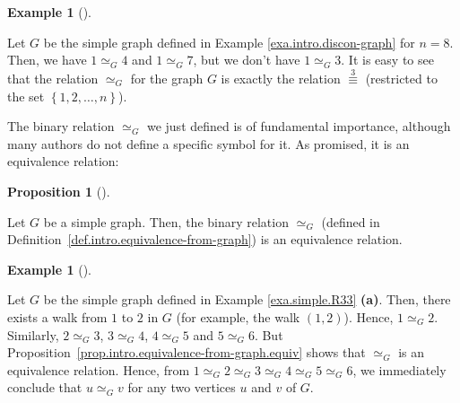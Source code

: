 \documentclass[numbers=enddot,12pt,final,onecolumn,notitlepage]{scrartcl}%
\theoremstyle{definition}
\newtheorem{prop}[theo]{Proposition}
\newenvironment{proposition}[1][]
{\begin{prop}[#1]\begin{leftbar}}
{\end{leftbar}\end{prop}}
\newtheorem{exam}[theo]{Example}
\newenvironment{example}[1][]
{\begin{exam}[#1]\begin{leftbar}}
{\end{leftbar}\end{exam}}
\newcommand{\set}[1]{\left\{ #1 \right\}}
\newcommand{\tup}[1]{\left( #1 \right)}
\begin{document}
\begin{example} \label{exa.intro.equivalence-from-graph.3}
Let $G$ be the simple graph defined in
Example \ref{exa.intro.discon-graph} for $n = 8$.
Then, we have $1 \simeq_G 4$ and $1 \simeq_G 7$, but we don't
have $1 \simeq_G 3$.
It is easy to see that the relation $\simeq_G$ for the graph
$G$ is exactly the relation $\overset{3}{\equiv}$ (restricted
to the set $\set{1, 2, \ldots, n}$).
\end{example}

The binary relation $\simeq_G$ we just defined is of fundamental
importance, although many authors do not define a specific symbol for
it. As promised, it is an equivalence relation:

\begin{proposition} \label{prop.intro.equivalence-from-graph.equiv}
Let $G$ be a simple graph. Then, the binary relation $\simeq_G$
(defined in Definition~\ref{def.intro.equivalence-from-graph}) is an
equivalence relation.
\end{proposition}

\begin{example} \label{exa.intro.equivalence-from-graph.2}
Let $G$ be the simple graph defined in
Example \ref{exa.simple.R33} \textbf{(a)}.
Then, there exists a walk from $1$ to $2$ in $G$ (for example,
the walk $\tup{1, 2}$).
Hence, $1 \simeq_G 2$.
Similarly, $2 \simeq_G 3$, $3 \simeq_G 4$, $4 \simeq_G 5$ and
$5 \simeq_G 6$.
But Proposition~\ref{prop.intro.equivalence-from-graph.equiv}
shows that $\simeq_G$ is an equivalence relation.
Hence, from
$1 \simeq_G 2 \simeq_G 3 \simeq_G 4 \simeq_G 5 \simeq_G 6$,
we immediately conclude that $u \simeq_G v$ for any two
vertices $u$ and $v$ of $G$.
\end{example}
\end{document}
